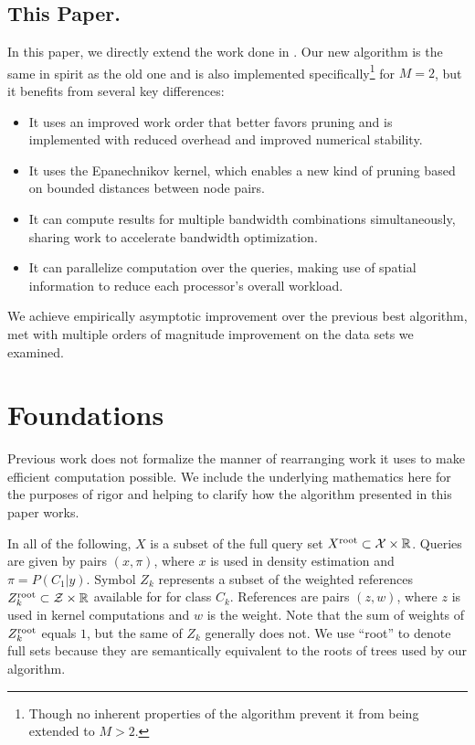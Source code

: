 \documentclass[twoside,leqno,twocolumn]{article}
\newcommand{\kdroot}[1]{#1^{\rm root}}
\begin{document}
\subsection{This Paper.}
In this paper, we directly extend the work done in
\cite{nbc-compstat}.  Our new algorithm is the same in spirit as the
old one and is also implemented specifically\footnote{Though no
inherent properties of the algorithm prevent it from being extended to
$M > 2$.} for $M = 2$, but it benefits from several key differences:
\begin{itemize}
\item It uses an improved work order that better favors pruning and is
  implemented with reduced overhead and improved numerical stability.
\item It uses the Epanechnikov kernel, which enables a new kind of
  pruning based on bounded distances between node pairs.
\item It can compute results for multiple bandwidth combinations
  simultaneously, sharing work to accelerate bandwidth optimization.
\item It can parallelize computation over the queries, making use of
  spatial information to reduce each processor's overall workload.
\end{itemize}
We achieve empirically asymptotic improvement over the previous best
algorithm, met with multiple orders of magnitude improvement on the
data sets we examined.

\section{Foundations}\label{sec:math}
Previous work \cite{nbc-compstat} does not formalize the manner of
rearranging work it uses to make efficient computation possible.  We
include the underlying mathematics here for the purposes of rigor and
helping to clarify how the algorithm presented in this paper works.

In all of the following, $X$ is a subset of the full query set
$\kdroot{X} \subset \mathcal{X} \times \mathbb{R}$.  Queries are given
by pairs $(x,\pi)$, where $x$ is used in density estimation and $\pi =
P(C_1|y)$.  Symbol $Z_k$ represents a subset of the weighted
references $\kdroot{Z_k} \subset \mathcal{Z} \times \mathbb{R}$
available for for class $C_k$.  References are pairs $(z,w)$, where
$z$ is used in kernel computations and $w$ is the weight.  Note that
the sum of weights of $\kdroot{Z_k}$ equals $1$, but the same of $Z_k$
generally does not.  We use ``root'' to denote full sets because they
are semantically equivalent to the roots of trees used by our
algorithm.
\end{document}
